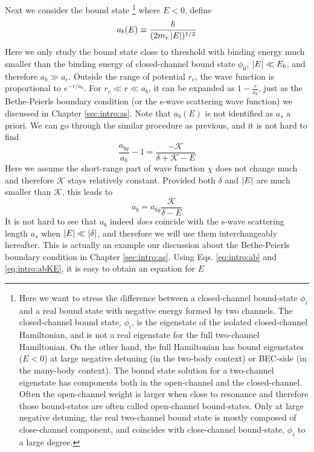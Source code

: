 Next we consider the bound state \footnote{Here we want to stress the difference between a closed-channel bound-state $\phi_{i}$ and a real bound state with negative energy formed by two channels.   The closed-channel bound state, $\phi_{i}$, is the eigenstate of the  isolated closed-channel Hamiltonian, and is not a real eigenstate for the full two-channel Hamiltonian.  On the other hand, the full  Hamiltonian has bound eigenstates ($E<0$) at large negative detuning (in the two-body context) or BEC-side (in the many-body context).  The bound state solution for a two-channel eigenstate has components both in the open-channel and the closed-channel.  Often the open-channel weight is larger when close to resonance and therefore those bound-states are often called open-channel bound-states.  Only at large negative detuning, the real two-channel bound state is mostly composed of close-channel component, and coincides with close-channel bound-state, $\phi_{i}$ to a large degree.}
where $E<0$, define
\begin{equation}\label{eq:intro:ab}
a_{b}(E)\equiv\frac{\hbar}{(2m_{r}\left\lvert{E}\right\rvert)^{1/2}}
\end{equation}
 Here we only study the bound state close to threshold with binding energy much smaller than the binding energy of closed-channel bound state $\phi_{0}$, $\left\lvert{E}\right\rvert\ll{}E_{b}$, and therefore $a_{b}\gg{a_{c}}$.  Outside the range of potential $r_{c}$,  the wave function is proportional to $e^{-r/a_{b}}$. For $r_{c}\ll{}r\ll{}a_{b}$, it can be expanded as  $1-\frac{r}{a_{b}}$, just as the Bethe-Peierls boundary condition (or the s-wave scattering wave function) we discussed in Chapter \ref{sec:intro:as}.  Note that $a_{b}(E)$ is not identified as $a_{s}$ a priori.  We can go through the similar procedure as previous, and it is not hard to find
\begin{equation}
\frac{a_{bg}}{a_{b}}-1=\frac{-\mathcal{K}}{\delta+\mathcal{K}-E}
\end{equation}
Here we assume the short-range part of wave function $\chi$ does not change much and therefore $\mathcal{K}$ stays relatively constant.  Provided both $\delta$ and $\left\lvert{E}\right\rvert$ are much smaller than $\mathcal{K}$, this leads to 
\begin{equation}\label{eq:intro:abKE}
a_{b}=a_{bg}\frac{\mathcal{K}}{\delta-E}
\end{equation}
It is not hard to see that $a_{b}$ indeed \emph{does} coincide with the s-wave scattering length $a_{s}$ when $\left\lvert{E}\right\rvert\ll\left\lvert{\delta}\right\rvert$, and therefore we will use them interchangeably hereafter. This is actually an example our discussion about the Bethe-Peierls boundary condition in Chapter \ref{sec:intro:as}.  Using Eqs. \ref{eq:intro:ab} and \ref{eq:intro:abKE}, it is easy to obtain an equation for $E$
